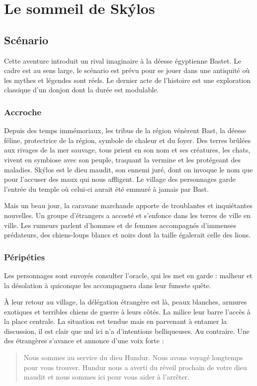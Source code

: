 \newcommand\skylos{Skýlos\xspace}
\chapter{Le sommeil de \skylos}

\section{Scénario}

Cette aventure introduit un rival imaginaire à la déesse égyptienne Bastet.
Le cadre est \medfan au sens large, le scénario est prévu pour se jouer dans une antiquité où les mythes et légendes sont réels.
Le dernier acte de l'histoire est une exploration classique d'un donjon dont la durée est modulable.


\subsection{Accroche}

Depuis des temps immémoriaux, les tribus de la région vénèrent Bast, la déesse féline, protectrice de la région, symbole de chaleur et du foyer. Des terres brûlées aux rivages de la mer sauvage, tous prient en son nom et ses créatures, les chats, vivent en symbiose avec son peuple, traquant la vermine et les protégeant des maladies. Skýlos est le dieu maudit, son ennemi juré, dont on invoque le nom que pour l'accuser des maux qui nous affligent. Le village des personnages garde l'entrée du temple où celui-ci aurait été emmuré à jamais par Bast.

Mais un beau jour, la caravane marchande apporte de troublantes et inquiétantes nouvelles. Un groupe d'étrangers a accosté et s'enfonce dans les terres de ville en ville. Les rumeurs parlent d'hommes et de femmes accompagnés d'immenses prédateurs, des chiens-loups blancs et noirs dont la taille égalerait celle des lions.

\subsection{Péripéties}

Les personnages sont envoyés consulter l'oracle, qui les met en garde : malheur et la désolation à quiconque les accompagnera dans leur funeste quête.

À leur retour au village, la délégation étrangère est là, peaux blanches, armures exotiques et terribles chiens de guerre à leurs côtés. La milice leur barre l'accès à la place centrale. La situation est tendue mais en parvenant à entamer la discussion, il est clair que nul ici n'a d'intentions belliqueuses. Au contraire. Une des étrangères s'avance et annonce d'une voix forte : \blockquote{Nous sommes au service du dieu Hundur. Nous avons voyagé longtemps pour vous trouver. Hundur nous a averti du réveil prochain de votre dieu maudit et nous sommes ici pour vous aider à l'arrêter.}

